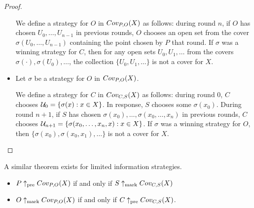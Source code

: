 \begin{proof}
\begin{itemize}
      We define a strategy for $O$ in $Cov_{P,O}(X)$ as follows: during round $n$, if $O$ has chosen $U_0,\dots,U_{n-1}$ in previous rounds, $O$ chooses an open set from the cover $\sigma(U_0,\dots,U_{n-1})$ containing the point chosen by $P$ that round. If $\sigma$ was a winning strategy for $C$, then for any open sets $U_0,U_1,\dots$ from the covers $\sigma(\cdot),\sigma(U_0),\dots$, the collection $\{U_0,U_1,\dots\}$ is not a cover for $X$.

      \item
      Let $\sigma$ be a strategy for $O$ in $Cov_{P,O}(X)$.

      We define a strategy for $C$ in $Cov_{C,S}(X)$ as follows: during round $0$, $C$ chooses $\mathcal{U}_0 = \{\sigma(x) : x\in X\}$. In response, $S$ chooses some $\sigma(x_0)$. During round $n+1$, if $S$ has chosen $\sigma(x_0),\dots,\sigma(x_0,\dots,x_n)$ in previous rounds, $C$ chooses $\mathcal{U}_{n+1} = \{\sigma(x_0,\dots,x_n,x) : x\in X\}$. If $\sigma$ was a winning strategy for $O$, then $\{\sigma(x_0),\sigma(x_0,x_1),\dots\}$ is not a cover for $X$.

    \end{itemize}
  \end{proof}

  A similar theorem exists for limited information strategies.

  \begin{theorem}
    \begin{itemize}
      \item $P\uparrow_{\text{pre}}Cov_{P,O}(X)$ if and only if $S\uparrow_{\text{mark}}Cov_{C,S}(X)$
      \item $O\uparrow_{\text{mark}}Cov_{P,O}(X)$ if and only if $C\uparrow_{\text{pre}}Cov_{C,S}(X)$.
    \end{itemize}
  \end{theorem}


